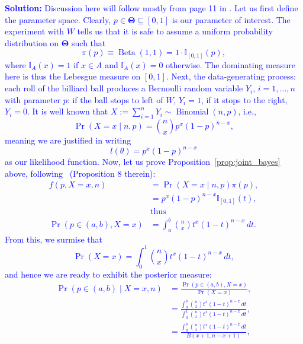 \documentclass[a4paper,10pt, notitlepage]{report}
\newcommand{\pr}{\operatorname{Pr}} %
\begin{document}
\textcolor{blue}{
\textbf{Solution:}
Discussion here will follow mostly from page 11 in \cite{Robert2007}.
Let us first define the parameter space.
Clearly, $p \in \boldsymbol{\Theta} \subseteq [0, 1]$ is our parameter of interest.
The experiment with $W$ tells us that it is safe to assume a uniform probability distribution on $\boldsymbol{\Theta}$ such that
\begin{equation*}
 \pi(p) \equiv \operatorname{Beta}(1, 1) = 1 \cdot \mathbb{I}_{[0, 1]}(p),
\end{equation*}
where $\mathbb{I}_{A}(x) = 1$ if $x \in A$ and $\mathbb{I}_{A}(x) = 0$ otherwise.
The dominating measure here is thus the Lebesgue measure on $[0, 1]$.
Next, the data-generating process: each roll of the billiard ball produces a Bernoulli random variable $Y_i$, $i = 1, \ldots,n$ with parameter $p$: if the ball stops to left of $W$, $Y_i = 1$, if it stops to the right, $Y_i = 0$.
It is well known that $X := \sum_{i=1}^n Y_i \sim \operatorname{Binomial}(n, p)$, i.e.,
\begin{equation*}
 \pr(X = x \mid n, p) = \binom{n}{x} p^x(1-p)^{n-x},
\end{equation*}
meaning we are justified in writing 
\begin{equation*}
 l(\theta) = p^x(1-p)^{n-x}
\end{equation*}
as our likelihood function.
Now, let us prove Proposition~\ref{prop:joint_bayes} above, following~\cite{Edwards1978} (Proposition 8 therein): 
\begin{align*}
 f(p, X = x, n) &= \pr(X = x \mid n, p)\pi(p),\\
 &= p^x(1-p)^{n-x}\mathbb{I}_{[0, 1]}(t),\\
 & \text{thus}\\
 \pr(p \in (a,b), X = x) &= \int_a^b \binom{n}{x} t^x(1-t)^{n-x}\,dt.
\end{align*}
From this, we surmise that
\begin{equation*}
 \pr(X = x) = \int_{0}^{1} \binom{n}{x} t^x(1-t)^{n-x}\,dt,
\end{equation*}
and hence we are ready to exhibit the posterior measure:
\begin{align}
\nonumber
 \pr( p \in (a, b) \mid X = x, n) &= \frac{\pr(p \in (a,b), X = x)}{\pr(X = x)},\\
 \nonumber
 &= \frac{\int_{a}^{b} \binom{n}{x} t^x(1-t)^{n-x}\,dt}{\int_{0}^{1} \binom{n}{x} t^x(1-t)^{n-x}\,dt},\\
 \label{eq:q1_posterior_density}
 &= \frac{\int_{a}^{b} \binom{n}{x} t^x(1-t)^{n-x}\,dt}{B(x + 1, n - x + 1)},

\end{align}}
\end{document}
